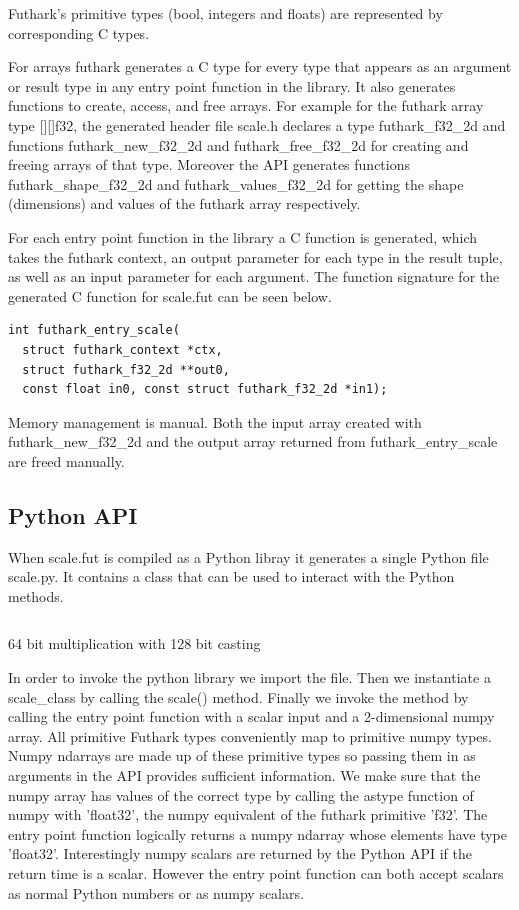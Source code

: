 \documentclass[11pt]{book}
\begin{document}
Futhark's primitive types (bool, integers and floats) are represented by corresponding C types.

For arrays futhark generates a C type for every type that appears as an argument or result type in any entry point function in the library. It also generates functions to create, access, and free arrays. For example for the futhark array type [][]f32, the generated header file scale.h declares a type futhark\_f32\_2d and functions futhark\_new\_f32\_2d and futhark\_free\_f32\_2d for creating and freeing arrays of that type. Moreover the API generates functions futhark\_shape\_f32\_2d and futhark\_values\_f32\_2d for getting the shape (dimensions) and values of the futhark array respectively. 

For each entry point function in the library a C function is generated, which takes the futhark context, an output parameter for each type in the result tuple, as well as an input parameter for each argument. The function signature for the generated C function for scale.fut can be seen below.
\begin{verbatim}
int futhark_entry_scale(
  struct futhark_context *ctx,
  struct futhark_f32_2d **out0,
  const float in0, const struct futhark_f32_2d *in1);
\end{verbatim}

Memory management is manual. Both the input array created with futhark\_new\_f32\_2d and the output array returned from futhark\_entry\_scale are freed manually.

\subsection{Python API}

When scale.fut is compiled as a Python libray it generates a single Python file scale.py. It contains a class that can be used to interact with the Python methods.
\begin{listing}[H] 
        \inputminted[fontsize=\small,baselinestretch=0.5,linenos]{C}{code/compiler/api_examples/example.py}
        \caption{64 bit multiplication with 128 bit casting}
        \label{lst:int128}    
\end{listing} 


In order to invoke the python library we import the file. Then we instantiate a scale\_class by calling the scale() method. Finally we invoke the method by calling the entry point function with a scalar input and a 2-dimensional numpy array. All primitive Futhark types conveniently map to primitive numpy types. Numpy ndarrays are made up of these primitive types so passing them in as arguments in the API provides sufficient information. We make sure that the numpy array has values of the correct type by calling the astype function of numpy with 'float32', the numpy equivalent of the futhark primitive 'f32'. The entry point function logically returns a numpy ndarray whose elements have type 'float32'. Interestingly numpy scalars are returned by the Python API if the return time is a scalar. However the entry point function can both accept scalars as normal Python numbers or as numpy scalars.
\end{document}
